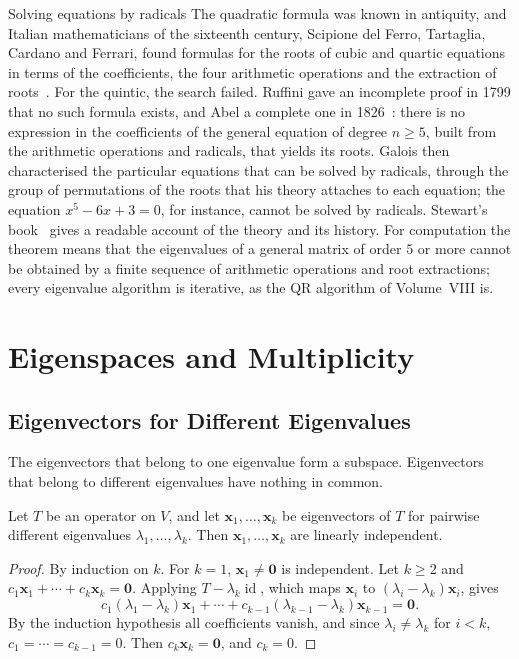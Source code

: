 \begin{note}{Solving equations by radicals}
The quadratic formula was known in antiquity, and Italian mathematicians of the sixteenth century, Scipione del Ferro, Tartaglia, Cardano and Ferrari, found formulas for the roots of cubic and quartic equations in terms of the coefficients, the four arithmetic operations and the extraction of roots~\cite{katz2009}. For the quintic, the search failed. Ruffini gave an incomplete proof in 1799 that no such formula exists, and Abel a complete one in 1826~\cite{abel1826quintic,stewart2015galois}: there is no expression in the coefficients of the general equation of degree $n\ge5$, built from the arithmetic operations and radicals, that yields its roots. Galois then characterised the particular equations that can be solved by radicals, through the group of permutations of the roots that his theory attaches to each equation; the equation $x^5-6x+3=0$, for instance, cannot be solved by radicals. Stewart's book~\cite{stewart2015galois} gives a readable account of the theory and its history. For computation the theorem means that the eigenvalues of a general matrix of order $5$ or more cannot be obtained by a finite sequence of arithmetic operations and root extractions; every eigenvalue algorithm is iterative, as the QR algorithm of Volume~VIII is.
\end{note}

\section{Eigenspaces and Multiplicity}
\label{sec:eigenspaces}

\subsection{Eigenvectors for Different Eigenvalues}

The eigenvectors that belong to one eigenvalue form a subspace. Eigenvectors that belong to different eigenvalues have nothing in common.

\begin{theorem}
\label{thm:distinct-independent}
Let $T$ be an operator on $V$, and let $\mathbf x_1,\ldots,\mathbf x_k$ be eigenvectors of $T$ for pairwise different eigenvalues $\lambda_1,\ldots,\lambda_k$. Then $\mathbf x_1,\ldots,\mathbf x_k$ are linearly independent.
\end{theorem}

\begin{proof}
By induction on $k$. For $k=1$, $\mathbf x_1\ne\mathbf 0$ is independent. Let $k\ge2$ and $c_1\mathbf x_1+\cdots+c_k\mathbf x_k=\mathbf 0$. Applying $T-\lambda_k\operatorname{id}$, which maps $\mathbf x_i$ to $(\lambda_i-\lambda_k)\mathbf x_i$, gives
\[
c_1(\lambda_1-\lambda_k)\mathbf x_1+\cdots+c_{k-1}(\lambda_{k-1}-\lambda_k)\mathbf x_{k-1}=\mathbf 0 .
\]
By the induction hypothesis all coefficients vanish, and since $\lambda_i\ne\lambda_k$ for $i<k$, $c_1=\cdots=c_{k-1}=0$. Then $c_k\mathbf x_k=\mathbf 0$, and $c_k=0$.
\end{proof}


